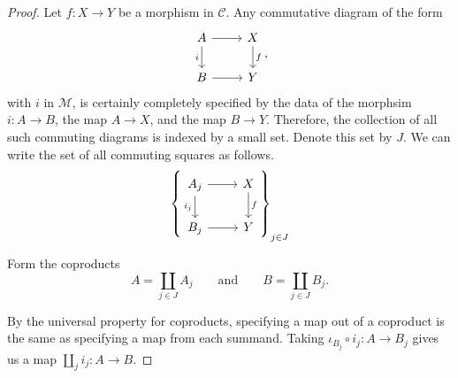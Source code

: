 \documentclass[main.tex]{subfiles}
\begin{document}
\begin{proof}
  Let $f\colon X \to Y$ be a morphism in $\mathcal{C}$. Any commutative diagram of the form
  \begin{equation*}
    \begin{tikzcd}
      A
      \arrow[r]
      \arrow[d, swap, "i"]
      & X
      \arrow[d, "f"]
      \\
      B
      \arrow[r]
      & Y
    \end{tikzcd},
  \end{equation*}
  with $i$ in $\mathcal{M}$, is certainly completely specified by the data of the morphsim $i\colon A \to B$, the map $A \to X$, and the map $B \to Y$. Therefore, the collection of all such commuting diagrams is indexed by a small set. Denote this set by $J$. We can write the set of all commuting squares as follows.
  \begin{equation*}
    \left\{
      \begin{tikzcd}
        A_{j}
        \arrow[r]
        \arrow[d, swap, "i_{j}"]
        & X
        \arrow[d, "f"]
        \\
        B_{j}
        \arrow[r]
        & Y
      \end{tikzcd}
    \right\}_{j \in J}
  \end{equation*}

  Form the coproducts
  \begin{equation*}
    A = \coprod_{j \in J} A_{j} \qquad\text{and}\qquad B = \coprod_{j \in J} B_{j}.
  \end{equation*}

  By the universal property for coproducts, specifying a map out of a coproduct is the same as specifying a map from each summand. Taking $\iota_{B_{j}} \circ i_{j}\colon A \to B_{j}$ gives us a map $\amalg_{j} i_{j}\colon A \to B$.


\end{proof}
\end{document}
